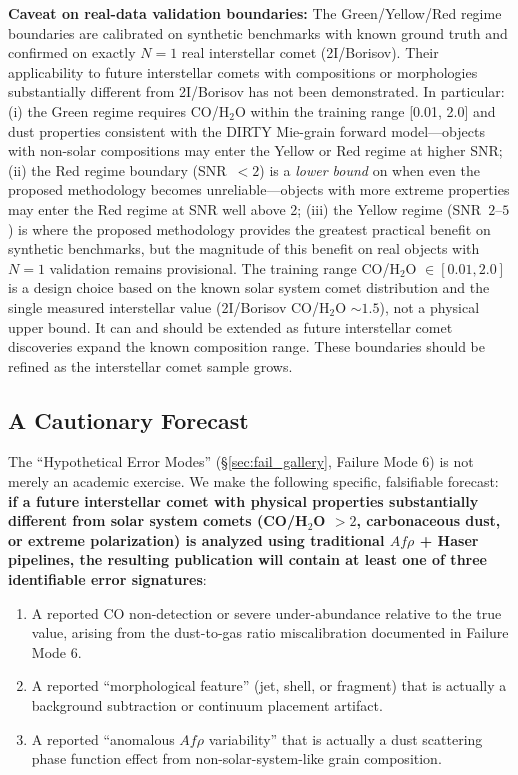 \documentclass[usenatbib]{mnras}
\begin{document}
\textbf{Caveat on real-data validation boundaries:} The Green/Yellow/Red regime boundaries are calibrated on synthetic benchmarks with known ground truth and confirmed on exactly $N=1$ real interstellar comet (2I/Borisov). Their applicability to future interstellar comets with compositions or morphologies substantially different from 2I/Borisov has not been demonstrated. In particular: (i) the Green regime requires CO/H$_2$O within the training range [0.01, 2.0] and dust properties consistent with the DIRTY Mie-grain forward model---objects with non-solar compositions may enter the Yellow or Red regime at higher SNR; (ii) the Red regime boundary (SNR~$<2$) is a \textit{lower bound} on when even the proposed methodology becomes unreliable---objects with more extreme properties may enter the Red regime at SNR well above 2; (iii) the Yellow regime (SNR~$2$--$5$) is where the proposed methodology provides the greatest practical benefit on synthetic benchmarks, but the magnitude of this benefit on real objects with $N=1$ validation remains provisional. The training range CO/H$_2$O $\in [0.01, 2.0]$ is a design choice based on the known solar system comet distribution and the single measured interstellar value (2I/Borisov CO/H$_2$O $\sim 1.5$), not a physical upper bound. It can and should be extended as future interstellar comet discoveries expand the known composition range. These boundaries should be refined as the interstellar comet sample grows.

\subsection{A Cautionary Forecast}

The ``Hypothetical Error Modes'' (\S\ref{sec:fail_gallery}, Failure Mode 6) is not merely an academic exercise. We make the following specific, falsifiable forecast: \textbf{if a future interstellar comet with physical properties substantially different from solar system comets (CO/H$_2$O $> 2$, carbonaceous dust, or extreme polarization) is analyzed using traditional $Af\rho$ + Haser pipelines, the resulting publication will contain at least one of three identifiable error signatures}:

\begin{enumerate}
    \item A reported CO non-detection or severe under-abundance relative to the true value, arising from the dust-to-gas ratio miscalibration documented in Failure Mode 6.
    \item A reported ``morphological feature'' (jet, shell, or fragment) that is actually a background subtraction or continuum placement artifact.
    \item A reported ``anomalous $Af\rho$ variability'' that is actually a dust scattering phase function effect from non-solar-system-like grain composition.
\end{enumerate}
\end{document}
